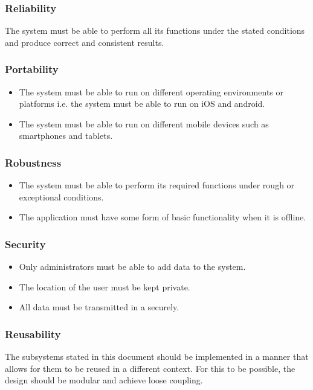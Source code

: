 \documentclass[english]{article}
\begin{document}
				\subsubsection{Reliability}
    				The system must be able to perform all its functions under the stated conditions and produce correct and consistent results. 
    				
				\subsubsection{Portability}
    				\begin{itemize}
        				\item The system must be able to run on different operating environments or platforms i.e. the system must be able to run on iOS and android.
        				\item The system must be able to run on different mobile devices such as smartphones and tablets.
    				\end{itemize}
    				
				\subsubsection{Robustness}
    			\begin{itemize}
    			\item The system must be able to perform its required functions under rough or exceptional conditions.
    			\item The application must have some form of basic functionality when it is offline.
    			\end{itemize}

    				
				\subsubsection{Security}
    				\begin{itemize}
        				\item Only administrators must be able to add data to the system.
        				\item The location of the user must be kept private. 
        				\item All data must be transmitted in a securely.
    				\end{itemize}
    				
				\subsubsection{Reusability}
				    The subsystems stated in this document should be implemented in a manner that allows for them to be reused in a different context. For this to be possible, the design should be modular and achieve loose coupling.
				    
\end{document}
